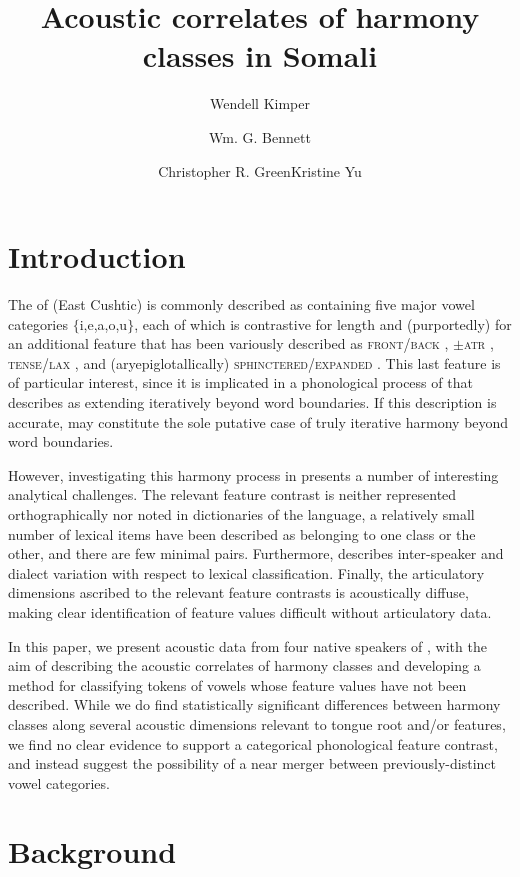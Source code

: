 \documentclass[output=paper
,newtxmath
,modfonts
,nonflat]{langsci/langscibook}
\author{Wendell Kimper\affiliation{University of Manchester}\and Wm. G. Bennett\affiliation{University of Calgary and Rhodes University}\and Christopher R. Green\affiliation{Syracuse University}\lastand Kristine Yu\affiliation{University of Massachusetts at Amherst}}
\title{Acoustic correlates of harmony classes in Somali}
\begin{document}
\section{Introduction}

The  of  (East Cushtic) is commonly described as containing five major vowel categories $\lbrace$i,e,a,o,u$\rbrace$, each of which is contrastive for length and (purportedly) for an additional feature that has been variously described as \textsc{front/back} \citep{Andrzejewski1955}, \textsc{$\pm$atr} \citep{Saeed1993}, \textsc{tense/lax} \citep{Greenetal2015}, and (aryepiglotallically) \textsc{sphinctered/expanded} \citep{Edmondsonetal2004}. This last feature is of particular interest, since it is implicated in a phonological process of  that \cite{Andrzejewski1955} describes as extending iteratively beyond word boundaries.  If this description is accurate,  may constitute the sole putative case of truly iterative harmony beyond word boundaries.

However, investigating this harmony process in  presents a number of interesting analytical challenges.  The relevant feature contrast is neither represented orthographically nor noted in dictionaries of the language, a relatively small number of lexical items have been described as belonging to one class or the other, and there are few minimal pairs.  Furthermore, \cite{Andrzejewski1955} describes inter-speaker and dialect variation with respect to lexical classification.  Finally, the articulatory dimensions ascribed to the relevant feature contrasts is acoustically diffuse, making clear identification of feature values difficult without articulatory data.

In this paper, we present acoustic data from four native speakers of , with the aim of describing the acoustic correlates of harmony classes and developing a method for classifying tokens of vowels whose feature values have not been described.  While we do find statistically significant differences between harmony classes along several acoustic dimensions relevant to tongue root and/or  features, we find no clear evidence to support a categorical phonological feature contrast, and instead suggest the possibility of a near merger between previously-distinct vowel categories.

\section{Background}
\label{background}
\end{document}
